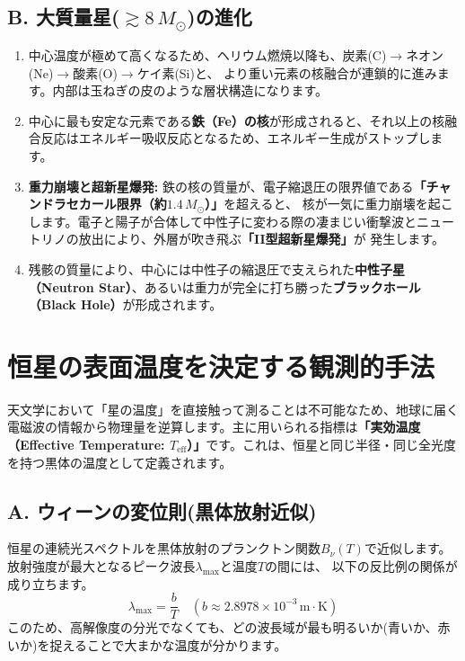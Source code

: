 \documentclass[11pt,a4paper]{article}
\begin{document}
\subsection{B. 大質量星($\gtrsim 8 \, M_\odot$)の進化}
\begin{enumerate}
    \item 中心温度が極めて高くなるため、ヘリウム燃焼以降も、炭素(C)$\rightarrow$ネオン(Ne)$\rightarrow$酸素(O)$\rightarrow$ケイ素(Si)と、
    より重い元素の核融合が連鎖的に進みます。内部は玉ねぎの皮のような層状構造になります。
    \item 中心に最も安定な元素である\textbf{鉄（Fe）の核}が形成されると、それ以上の核融合反応はエネルギー吸収反応となるため、エネルギー生成がストップします。
    \item \textbf{重力崩壊と超新星爆発:} 鉄の核の質量が、電子縮退圧の限界値である\textbf{「チャンドラセカール限界（約$1.4 \, M_\odot$）」}を超えると、
    核が一気に重力崩壊を起こします。電子と陽子が合体して中性子に変わる際の凄まじい衝撃波とニュートリノの放出により、外層が吹き飛ぶ\textbf{「II型超新星爆発」}が
    発生します。
    \item 残骸の質量により、中心には中性子の縮退圧で支えられた\textbf{中性子星（Neutron Star）}、あるいは重力が完全に打ち勝った\textbf{ブラックホール
    （Black Hole）}が形成されます。
\end{enumerate}

\section{恒星の表面温度を決定する観測的手法}
天文学において「星の温度」を直接触って測ることは不可能なため、地球に届く電磁波の情報から物理量を逆算します。主に用いられる指標は\textbf{「実効温度
（Effective Temperature: $T_{\text{eff}}$）」}です。これは、恒星と同じ半径・同じ全光度を持つ黒体の温度として定義されます。

\subsection{A. ウィーンの変位則(黒体放射近似)}
恒星の連続光スペクトルを黒体放射のプランクトン関数$B_\nu(T)$で近似します。放射強度が最大となるピーク波長$\lambda_{\text{max}}$と温度$T$の間には、
以下の反比例の関係が成り立ちます。
\begin{equation}
    \lambda_{\text{max}} = \frac{b}{T} \quad (b \approx 2.8978 \times 10^{-3} \, \text{m} \cdot \text{K})
\end{equation}
このため、高解像度の分光でなくても、どの波長域が最も明るいか(青いか、赤いか)を捉えることで大まかな温度が分かります。
\end{document}
